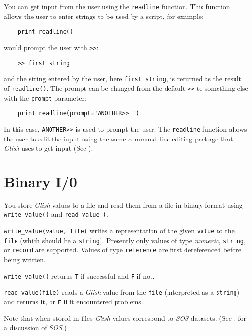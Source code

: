 \label{readline-func}
You can get input from the user using the {\tt readline} function. This
function allows the user to enter strings to be used by a script, for example:
\begin{verbatim}
    print readline()
\end{verbatim}
would prompt the user with \verb+>>+:
\begin{verbatim}
    >> first string
\end{verbatim}
and the string entered by the user, here \verb+first string+, is returned as
the result of \verb+readline()+. The prompt can be changed from the default
\verb+>>+ to something else with the {\tt prompt} parameter:
\begin{verbatim}
    print readline(prompt='ANOTHER>> ')
\end{verbatim}
In this case, \verb+ANOTHER>>+ is used to prompt the user.
The {\tt readline} function allows the user to edit the input using the same
command line editing package that {\em Glish} uses to get input
(See ).

\section{Binary I/0}
\label{reading-writing}
\label{binary-io}
You store {\em Glish} values to a file and read them from a file in
binary format using {\tt write\_value()} and {\tt read\_value()}.

\label{write_value-func}
{\tt write\_value(value, file)} writes a representation of the given
{\tt value} to the {\tt file} (which should be a {\tt string}).
Presently only values of type {\em numeric\/}, {\tt string}, or
{\tt record} are supported.  Values of type {\tt reference} are first
dereferenced before being written.

{\tt write\_value()} returns {\tt T} if successful and {\tt F} if not.

\label{read_value-func}
{\tt read\_value(file)} reads a {\em Glish} value from the {\tt file}
(interpreted as a {\tt string}) and returns it, or {\tt F} if it
encountered problems.

Note that when stored in files {\em Glish} values correspond to {\em SOS}
datasets. (See , for a discussion of {\em SOS\/}.)

